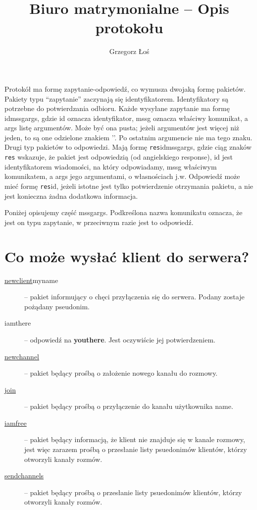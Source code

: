 \documentclass[a4paper, 10pt]{article}
\author{Grzegorz Łoś}
\title{\textbf{Biuro matrymonialne} -- Opis protokołu}
\begin{document}
\maketitle

Protokół ma formę zapytanie-odpowiedź, co wymusza dwojaką formę pakietów. Pakiety typu ``zapytanie'' zaczynają się identyfikatorem. Identyfikatory są potrzebne do potwierdzania odbioru. Każde wysyłane zapytanie ma formę id\textbar mssg\textbar args, gdzie id oznacza identyfikator, mssg oznacza właściwy komunikat, a args listę argumentów. Może być ona pusta; jeżeli argumentów jest więcej niż jeden, to są one odzielone znakiem '\textbar '. Po ostatnim argumencie nie ma tego znaku. Drugi typ pakietów to odpowiedzi. Mają formę \texttt{res}\textbar id\textbar mssg\textbar args, gdzie ciąg znaków \texttt{res} wskazuje, że pakiet jest odpowiedzią (od angielskiego response), id jest identyfikatorem wiadomości, na który odpowiadamy, mssg właściwym komunikatem, a args jego argumentami, o własnościach j.w. Odpowiedź może mieć formę \texttt{res}\textbar id, jeżeli istotne jest tylko potwierdzenie otrzymania pakietu, a nie jest konieczna żadna dodatkowa informacja.

Poniżej opisujemy część mssg\textbar args. Podkreślona nazwa komunikatu oznacza, że jest on typu zapytanie, w przeciwnym razie jest to odpowiedź.

\section{Co może wysłać klient do serwera?}
\begin{description}
 \item[ \underline{newclient}\textbar myname] -- pakiet informujący o chęci przyłączenia się do serwera. Podany zostaje pożądany pseudonim.
 \item[ iamthere\textbar] -- odpowiedź na \textbf{youthere}. Jest oczywiście jej potwierdzeniem.
 \item[ \underline{newchannel}\textbar] -- pakiet będący prośbą o założenie nowego kanału do rozmowy.
 \item[ \underline{join}] -- pakiet będący prośbą o przyłączenie do kanału użytkownika {name}.
 \item[ \underline{iamfree}\textbar] -- pakiet będący informacją, że klient nie znajduje się w kanale rozmowy, jest więc zarazem prośbą o przesłanie listy psuedonimów klientów, którzy otworzyli kanały rozmów.
 \item[ \underline{sendchannels}\textbar] -- pakiet będący prośbą o przesłanie listy psuedonimów klientów, którzy otworzyli kanały rozmów.
\end{description}
\end{document}
